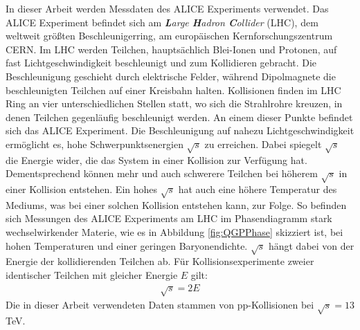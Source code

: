 In dieser Arbeit werden Messdaten des ALICE Experiments verwendet.
Das ALICE Experiment befindet sich am \textit{\textbf{L}arge \textbf{H}adron \textbf{C}ollider} (LHC), dem weltweit größten Beschleunigerring, am europäischen Kernforschungszentrum CERN.
Im LHC werden Teilchen, hauptsächlich Blei-Ionen und Protonen, auf fast Lichtgeschwindigkeit beschleunigt und zum Kollidieren gebracht.
Die Beschleunigung geschieht durch elektrische Felder, während Dipolmagnete die beschleunigten Teilchen auf einer Kreisbahn halten.
Kollisionen finden im LHC Ring an vier unterschiedlichen Stellen statt, wo sich die Strahlrohre kreuzen, in denen Teilchen gegenläufig beschleunigt werden.
An einem dieser Punkte befindet sich das ALICE Experiment.
\newline
Die Beschleunigung auf nahezu Lichtgeschwindigkeit ermöglicht es, hohe Schwerpunktsenergien $\sqrt{s}$ zu erreichen.
Dabei spiegelt $\sqrt{s}$ die Energie wider, die das System in einer Kollision zur Verfügung hat.
Dementsprechend können mehr und auch schwerere Teilchen bei höherem $\sqrt{s}$  in einer Kollision entstehen.
Ein hohes $\sqrt{s}$ hat auch eine höhere Temperatur des Mediums, was bei einer solchen Kollision entstehen kann, zur Folge.
So befinden sich Messungen des ALICE Experiments am LHC im Phasendiagramm stark wechselwirkender Materie, wie es in Abbildung \ref{fig:QGPPhase} skizziert ist, bei hohen Temperaturen und einer geringen Baryonendichte.
$\sqrt{s}$ hängt dabei von der Energie der kollidierenden Teilchen ab.
Für Kollisionsexperimente zweier identischer Teilchen mit gleicher Energie $E$ gilt:
\begin{align}
\sqrt{s} = 2E \label{eq:sqrts}
\end{align}
\newline
Die in dieser Arbeit verwendeten Daten stammen von pp-Kollisionen bei $\sqrt{s} = 13$ TeV.